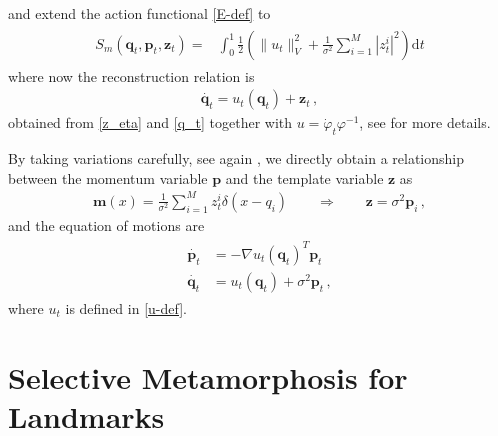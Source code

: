 \documentclass[runningheads]{llncs}
\newcommand{\half}{\frac 12}
\newcommand{\norm}[2]{\| #1 \|_{ #2 }}
\newcommand{\vnorm}[1]{\norm{ #1 }{V}}
\newcommand{\diff}[1]{\text{d} #1}
\begin{document}
and extend the action functional \eqref{E-def} to 
\begin{align}
  \begin{split}
    S_m(\mathbf q_t, \mathbf p_t, \mathbf z_t) = & \int_0^1
    \half  \left (\vnorm{u_t}^2 + \frac{1}{\sigma^2} \sum_{i=1}^M |z_t^i|^2\right )\diff{t}
  \end{split}
  \label{E_m-def}
\end{align}
where now the reconstruction relation is 
\begin{align}
    \dot{\mathbf q_t} = u_t (\mathbf q_t) + \mathbf z_t\, , 
    \label{dq-m}
\end{align}
obtained from \eqref{z_eta} and \eqref{q_t} together with  $u= \dot \varphi_t \varphi^{-1}$, 
see \cite{holm2009euler} for more details.  

By taking variations carefully, see again \cite{holm2009euler}, we directly obtain a relationship
between the momentum variable $\mathbf p$ and the template variable $\mathbf z$ as
\begin{align}
  \mathbf m(x) = \frac{1}{\sigma^2} \sum_{i=1}^M z_t^i\delta(x-q_i)\qquad \Rightarrow \qquad
  \mathbf z = \sigma^2 \mathbf p_i\, , 
\end{align}
and the equation of motions are
\begin{align}
  \begin{split}
  \dot{\mathbf p_t} &= - \nabla u_t(\mathbf q_t)^T \mathbf p_t\\ 
  \dot{\mathbf q_t} &= u_t(\mathbf q_t) +  \sigma^2\mathbf p_t \,,
  \end{split}
  \label{eq-m-classic}
\end{align}
where $u_t$ is defined in \eqref{u-def}. 


\section{Selective Metamorphosis for Landmarks}\label{sec:select_mm}
\end{document}
